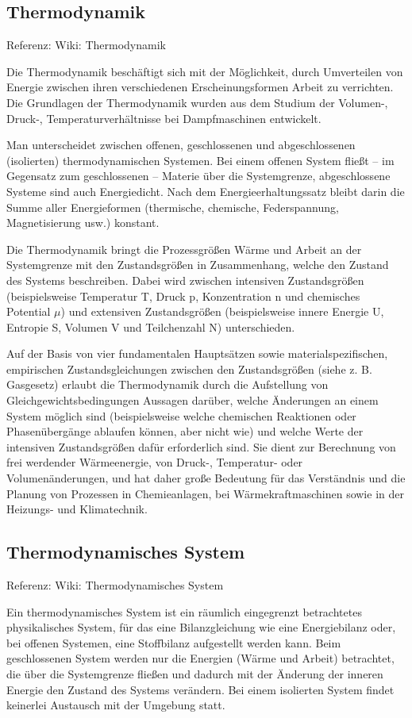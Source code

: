 \documentclass[]{article}
\begin{document}
\subsection{Thermodynamik}
Referenz: Wiki: Thermodynamik

Die Thermodynamik beschäftigt sich mit der Möglichkeit, durch Umverteilen von Energie zwischen ihren verschiedenen Erscheinungsformen Arbeit zu verrichten. Die Grundlagen der Thermodynamik wurden aus dem Studium der Volumen-, Druck-, Temperaturverhältnisse bei Dampfmaschinen entwickelt.

Man unterscheidet zwischen offenen, geschlossenen und abgeschlossenen (isolierten) thermodynamischen Systemen. Bei einem offenen System fließt – im Gegensatz zum geschlossenen – Materie über die Systemgrenze, abgeschlossene Systeme sind auch Energiedicht. Nach dem Energieerhaltungssatz bleibt darin die Summe aller Energieformen (thermische, chemische, Federspannung, Magnetisierung usw.) konstant.

Die Thermodynamik bringt die Prozessgrößen Wärme und Arbeit an der Systemgrenze mit den Zustandsgrößen in Zusammenhang, welche den Zustand des Systems beschreiben. Dabei wird zwischen intensiven Zustandsgrößen (beispielsweise Temperatur T, Druck p, Konzentration n und chemisches Potential $\mu$) und extensiven Zustandsgrößen (beispielsweise innere Energie U, Entropie S, Volumen V und Teilchenzahl N) unterschieden.

Auf der Basis von vier fundamentalen Hauptsätzen sowie materialspezifischen, empirischen Zustandsgleichungen zwischen den Zustandsgrößen (siehe z. B. Gasgesetz) erlaubt die Thermodynamik durch die Aufstellung von Gleichgewichtsbedingungen Aussagen darüber, welche Änderungen an einem System möglich sind (beispielsweise welche chemischen Reaktionen oder Phasenübergänge ablaufen können, aber nicht wie) und welche Werte der intensiven Zustandsgrößen dafür erforderlich sind. Sie dient zur Berechnung von frei werdender Wärmeenergie, von Druck-, Temperatur- oder Volumenänderungen, und hat daher große Bedeutung für das Verständnis und die Planung von Prozessen in Chemieanlagen, bei Wärmekraftmaschinen sowie in der Heizungs- und Klimatechnik.

\subsection{Thermodynamisches System}
Referenz: Wiki: Thermodynamisches System

Ein thermodynamisches System ist ein räumlich eingegrenzt betrachtetes physikalisches System, für das eine Bilanzgleichung wie eine Energiebilanz oder, bei offenen Systemen, eine Stoffbilanz aufgestellt werden kann. Beim geschlossenen System werden nur die Energien (Wärme und Arbeit) betrachtet, die über die Systemgrenze fließen und dadurch mit der Änderung der inneren Energie den Zustand des Systems verändern. Bei einem isolierten System findet keinerlei Austausch mit der Umgebung statt.
\end{document}
